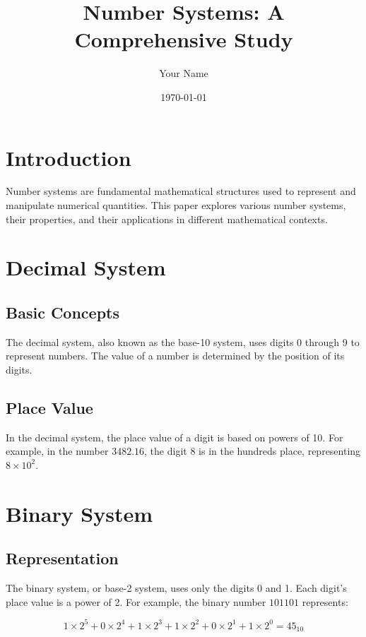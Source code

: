 \documentclass{article}
\title{Number Systems: A Comprehensive Study}
\author{Your Name}
\date{\today}
\begin{document}
\maketitle

\section{Introduction}

Number systems are fundamental mathematical structures used to represent and manipulate numerical quantities. This paper explores various number systems, their properties, and their applications in different mathematical contexts.

\section{Decimal System}

\subsection{Basic Concepts}

The decimal system, also known as the base-10 system, uses digits 0 through 9 to represent numbers. The value of a number is determined by the position of its digits.

\subsection{Place Value}

In the decimal system, the place value of a digit is based on powers of 10. For example, in the number $3482.16$, the digit $8$ is in the hundreds place, representing $8 \times 10^2$.

\section{Binary System}

\subsection{Representation}

The binary system, or base-2 system, uses only the digits 0 and 1. Each digit's place value is a power of 2. For example, the binary number $101101$ represents:

\begin{equation}
    1 \times 2^5 + 0 \times 2^4 + 1 \times 2^3 + 1 \times 2^2 + 0 \times 2^1 + 1 \times 2^0 = 45_{10}
\end{equation}
\end{document}
